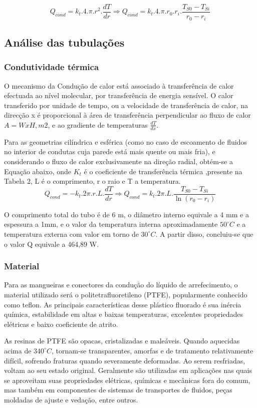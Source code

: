 $$ Q_{cond} = k_{t}.4.\pi.r^2.\frac{dT}{dr} \Longrightarrow Q_{cond} = k_{t}.4.\pi.r_{0}.r_{i}.\frac{T_{S0}-T_{Si}}{r_{0}-r_{i}}$$


\subsection{Análise das tubulações}

\subsubsection{Condutividade térmica}
O mecanismo da Condução de calor está associado à transferência de calor efectuada ao nível molecular, por transferência de energia sensível. O calor transferido por unidade de tempo, ou a velocidade de transferência de calor, na direcção x é proporcional à área de transferência perpendicular ao fluxo de calor $A=WxH, m2$, e ao gradiente de temperaturas $\frac{dT}{dx}$.

Para as geometrias cilíndrica e esférica (como no caso de escoamento de fluidos no interior de condutas cuja parede está mais quente ou mais fria), e considerando o fluxo de calor exclusivamente na direção radial, obtém-se a Equação abaixo, onde $K_{t}$ é o coeficiente de transferência térmica ,presente na Tabela 2, L é o comprimento, r o raio e T a temperatura.
$$ Q_{cond} = -k_{t}.2\pi.r.L.\frac{dT}{dr} \Longrightarrow Q_{cond} = k_{t}.2\pi.L.\frac{T_{S0}-T_{Si}}{\ln (r_{0}-r_{i})}$$

O comprimento total do tubo é de 6 m, o diâmetro interno equivale a 4 mm e a espessura a 1mm, e o valor da temperatura interna aproximadamente $50^{\circ}C$ e a temperatura externa com valor em torno de $30^{\circ}C$. A partir disso, concluiu-se que o valor Q equivale a 464,89 W.

\subsubsection{Material}
Para as mangueiras e conectores da condução do líquido de arrefecimento, o material utilizado será o politetrafluoretileno (PTFE), popularmente conhecido como teflon. As principais características desse plástico fluorado é sua inércia química, estabilidade em altas e baixas temperaturas, excelentes propriedades elétricas e baixo coeficiente de atrito.

As resinas de PTFE são opacas, cristalizadas e maleáveis. Quando aquecidas acima de $340^{\circ}C$, tornam-se transparentes, amorfas e de tratamento relativamente difícil, sofrendo fraturas quando severamente deformadas. Ao serem resfriadas, voltam ao seu estado original. Geralmente são utilizadas em aplicações nas quais se aproveitam suas propriedades elétricas, químicas e mecânicas fora do comum, mas também em componentes de sistemas de transportes de fluidos, peças moldadas de ajuste e vedação, entre outros.\\

